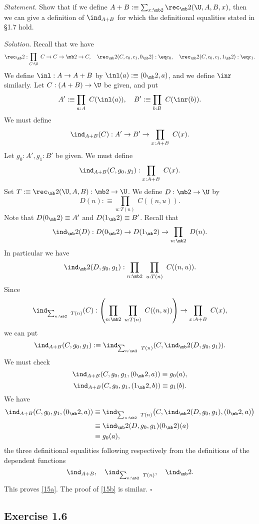 \documentclass[12pt]{article}
\begin{document}
\emph{Statement.} Show that if we define $A+B:\equiv\sum_{x:\mb2}\rec_\mb2(\U,A,B,x)$, then we can give a definition of $\ind_{A+B}$ for which the definitional equalities stated in \S1.7 hold.

\nn\emph{Solution.} Recall that we have 
$$
\rec_\mb2:\prod_{C:\U}\ C\to C\to\mb2\to C,\quad\rec_\mb2(C,c_0,c_1,0_\mb2):\eq c_0,\quad\rec_\mb2(C,c_0,c_1,1_\mb2):\eq c_1.
$$
We define $\inl:A\to A+B$ by $\inl(a):\equiv(0_\mb2,a)$, and we define $\inr$ similarly. Let $C:(A+B)\to\U$ be given, and put 
$$
A':\equiv\prod_{a:A}\ C(\inl(a)),\quad B':\equiv\prod_{b:B}\ C(\inr(b)).
$$
We must define 
$$
\ind_{A+B}(C):A'\to B'\to\prod_{x:A+B}\ C(x).
$$ 
Let $g_0:A',g_1:B'$ be given. We must define 
$$
\ind_{A+B}(C,g_0,g_1):\prod_{x:A+B}\ C(x).
$$ 
Set $T:\equiv\rec_\mb2(\U,A,B):\mb2\to\U$. We define $D:\mb2\to\U$ by 
$$
D(n):\equiv\prod_{u:T(n)}\ C((n,u)).
$$ 
Note that $D(0_\mb2)\equiv A'$ and $D(1_\mb2)\equiv B'$. Recall that 
$$
\ind_\mb2(D):D(0_\mb2)\to D(1_\mb2)\to\prod_{n:\mb2}\ D(n).
$$ 
In particular we have 
$$
\ind_\mb2(D,g_0,g_1):\prod_{n:\mb2}\ \prod_{u:T(n)}\ C((n,u)).
$$ 
Since 
$$
\ind_{\sum_{n:\mb2}\ T(n)}(C):\left(\prod_{n:\mb2}\ \prod_{u:T(n)}\ C((n,u))\right)\to\prod_{x:A+B}\ C(x),
$$ 
we can put 
$$
\ind_{A+B}(C,g_0,g_1):\equiv\ind_{\sum_{n:\mb2}\ T(n)}(C,\ind_\mb2(D,g_0,g_1)).
$$ 
We must check 
\begin{equation}\label{15a}
\ind_{A+B}(C,g_0,g_1,(0_\mb2,a))\equiv g_0(a),
\end{equation}
\begin{equation}\label{15b}
\ind_{A+B}(C,g_0,g_1,(1_\mb2,b))\equiv g_1(b).
\end{equation} 
We have 
\begin{align*}
\ind_{A+B}(C,g_0,g_1,(0_\mb2,a))&\equiv\ind_{\sum_{n:\mb2}\ T(n)}\big(C,\ind_\mb2(D,g_0,g_1),(0_\mb2,a)\big)\\ 
&\equiv\ind_\mb2(D,g_0,g_1)(0_\mb2)(a)\\ 
&\equiv g_0(a),
\end{align*}
the three definitional equalities following respectively from the definitions of the dependent functions
$$
\ind_{A+B},\quad\ind_{\sum_{n:\mb2}\ T(n)},\quad\ind_\mb2.
$$ 
This proves \eqref{15a}. The proof of \eqref{15b} is similar. $\square$


\subsection{Exercise 1.6}
\end{document}
